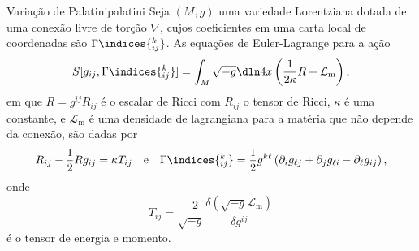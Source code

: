 \documentclass[portuguese]{artigo}
\begin{document}
\begin{theorem}{Variação de Palatini}{palatini}
    Seja \((M,g)\) uma variedade Lorentziana dotada de uma conexão livre de torção \(\nabla\), cujos coeficientes em uma carta local de coordenadas são \(\Gamma\indices{^k_{ij}}\). As equações de Euler-Lagrange para a ação
    \begin{equation*}
        S[g_{ij}, \Gamma\indices{^k_{ij}}] = \int_M \sqrt{-g}\dln4x \left(\frac{1}{2 \kappa} R + \mathcal{L}_\mathrm{m}\right),
    \end{equation*}
    em que \(R = g^{ij}R_{ij}\) é o escalar de Ricci com \(R_{ij}\) o tensor de Ricci, \(\kappa\) é uma constante, e \(\mathcal{L}_\mathrm{m}\) é uma densidade de lagrangiana para a matéria que não depende da conexão, são dadas por
    \begin{equation*}
        R_{ij} - \frac12 Rg_{ij} = \kappa T_{ij}\quad\text{e}\quad \Gamma\indices{^k_{ij}} = \frac12 g^{k\ell}\left(\partial_ig_{\ell j} + \partial_j g_{\ell i} - \partial_\ell g_{ij}\right),
    \end{equation*}
    onde
    \begin{equation*}
        T_{ij} = \frac{-2}{\sqrt{-g}}\frac{\delta (\sqrt{-g} \mathcal{L}_\mathrm{m})}{\delta g^{ij}}
    \end{equation*}
    é o tensor de energia e momento.
\end{theorem}
\end{document}
